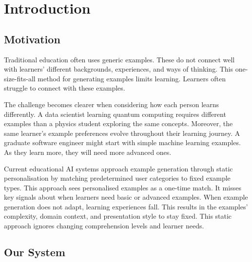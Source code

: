 \documentclass[sigconf]{acmart}
\begin{document}


\maketitle

\section{Introduction}

\subsection{Motivation}

Traditional education often uses generic examples. These do not connect well with learners' different backgrounds, experiences, and ways of thinking. This one-size-fits-all method for generating examples limits learning. Learners often struggle to connect with these examples.

The challenge becomes clearer when considering how each person learns differently. A data scientist learning quantum computing requires different examples than a physics student exploring the same concepts. Moreover, the same learner's example preferences evolve throughout their learning journey. A graduate software engineer might start with simple machine learning examples. As they learn more, they will need more advanced ones.

Current educational AI systems approach example generation through static personalisation by matching predetermined user categories to fixed example types. This approach sees personalised examples as a one-time match. It misses key signals about when learners need basic or advanced examples. When example generation does not adapt, learning experiences fall. This results in the examples' complexity, domain context, and presentation style to stay fixed. This static approach ignores changing comprehension levels and learner needs.

\subsection{Our System}
\end{document}

